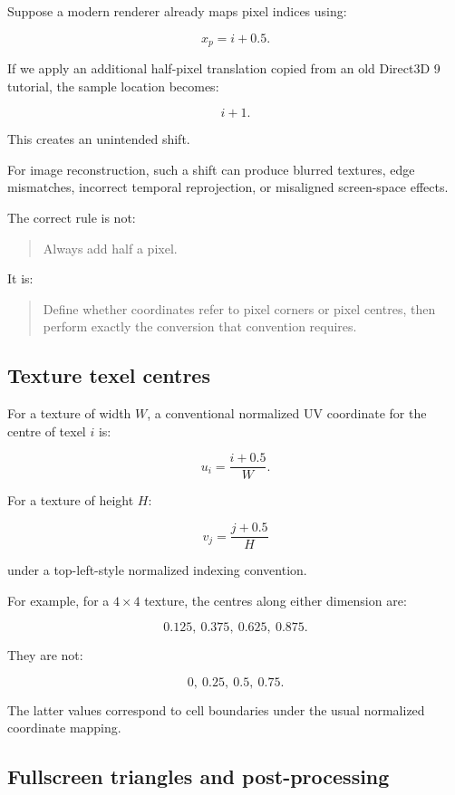 Suppose a modern renderer already maps pixel indices using:

\[
 x_p=i+0.5.
\]

If we apply an additional half-pixel translation copied from an old Direct3D 9 tutorial, the sample location becomes:

\[
 i+1.
\]

This creates an unintended shift.

For image reconstruction, such a shift can produce blurred textures, edge mismatches, incorrect temporal reprojection, or misaligned screen-space effects.

The correct rule is not:

\begin{quote}
Always add half a pixel.
\end{quote}

It is:

\begin{quote}
Define whether coordinates refer to pixel corners or pixel centres, then perform exactly the conversion that convention requires.
\end{quote}

\subsection{Texture texel centres}\label{02-foundations-ii-ch033-texture-texel-centres}

For a texture of width \(W\), a conventional normalized UV coordinate for the centre of texel \(i\) is:

\[
 \boxed{ u_i=\frac{i+0.5}{W} }.
\]

For a texture of height \(H\):

\[
 \boxed{ v_j=\frac{j+0.5}{H} }
\]

under a top-left-style normalized indexing convention.

For example, for a \(4\times4\) texture, the centres along either dimension are:

\[
 \boxed{ 0.125,\ 0.375,\ 0.625,\ 0.875 }.
\]

They are not:

\[
 0,\ 0.25,\ 0.5,\ 0.75.
\]

The latter values correspond to cell boundaries under the usual normalized coordinate mapping.

\subsection{Fullscreen triangles and post-processing}\label{02-foundations-ii-ch033-fullscreen-triangles-and-post-processing}

